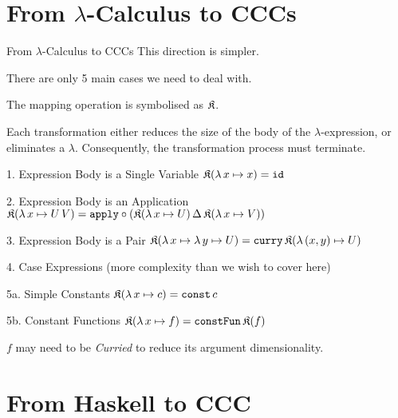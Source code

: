 \documentclass[10pt]{beamer}
\newcommand{\id}{\mathtt{id}}
\newcommand{\apply}{\mathtt{apply}}
\newcommand{\curry}{\mathtt{curry}}
\newcommand{\lamf}[2]{\ensuremath{\lambda\, #1 \mapsto #2}}
\newcommand{\lamtoccc}[1]{\ensuremath{\frak{K}(#1)}}
\newcommand{\delprod}[2]{\ensuremath{#1\,\Delta\,#2}}
\newcommand{\const}{\ensuremath{\mathtt{const}}}
\newcommand{\constFun}{\ensuremath{\mathtt{constFun}}}
\theoremstyle{definition}
\theoremstyle{remark}
\numberwithin{equation}{section}
\begin{document}
\section{From $\lambda$-Calculus to CCCs}

\begin{frame}[fragile]{From $\lambda$-Calculus to CCCs}
  This direction is simpler.

  There are only 5 main cases we need to deal with.

  The mapping operation is symbolised as $\frak{K}$.

  Each transformation either reduces the size of the body of the $\lambda$-expression,
  or eliminates a $\lambda$.
  Consequently, the transformation process must terminate.
\end{frame}

\begin{frame}[fragile]{1. Expression Body is a Single Variable}
  $\lamtoccc{\lamf{x}{x}} = \id$
\end{frame}

\begin{frame}[fragile]{2. Expression Body is an Application}
  $\lamtoccc{\lamf{x}{U\,V}} = \apply \circ (\delprod{\lamtoccc{\lamf{x}{U}}}{\lamtoccc{\lamf{x}{V}}})$
\end{frame}

\begin{frame}[fragile]{3. Expression Body is a Pair}
  $\lamtoccc{\lamf{x}{\lamf{y}{U}}} = \curry\, \lamtoccc{\lamf{(x,y)}{U}}$
\end{frame}

\begin{frame}[fragile]{4. Case Expressions}
  (more complexity than we wish to cover here)
\end{frame}

\begin{frame}[fragile]{5a. Simple Constants}
  $\lamtoccc{\lamf{x}{c}} = \const\, c$
\end{frame}

\begin{frame}[fragile]{5b. Constant Functions}
  $\lamtoccc{\lamf{x}{f}} = \constFun\, \lamtoccc{f}$

  $f$ may need to be \emph{Curried} to reduce its argument dimensionality.
\end{frame}

\section{From Haskell to CCC} %
\end{document}
